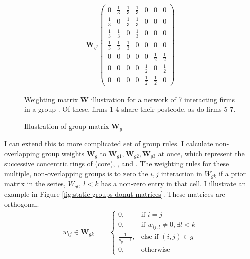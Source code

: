 \begin{figure}[hbtp]
    \caption{Illustration of group matrix $\mathbf W_g$}
    \label{fig:static-groups-W}
    \centering
    \par\noindent
    \begin{align*}
        \mathbf{W}_{g^*}
        \begin{pmatrix}
            0           & \frac{1}{3} & \frac{1}{3} & \frac{1}{3} & 0           & 0           & 0           \\
            \frac{1}{3} & 0           & \frac{1}{3} & \frac{1}{3} & 0           & 0           & 0           \\
            \frac{1}{3} & \frac{1}{3} & 0           & \frac{1}{3} & 0           & 0           & 0           \\
            \frac{1}{3} & \frac{1}{3} & \frac{1}{3} & 0           & 0           & 0           & 0           \\
            0           & 0           & 0           & 0           & 0           & \frac{1}{2} & \frac{1}{2} \\
            0           & 0           & 0           & 0           & \frac{1}{2} & 0           & \frac{1}{2} \\
            0           & 0           & 0           & 0           & \frac{1}{2} & \frac{1}{2} & 0           
        \end{pmatrix}
    \end{align*}
    \begin{tablenotes}
        Weighting matrix $\mathbf W$ illustration for a network of 7 interacting firms in a group .
        Of these, firms 1-4 share their postcode, as do firms 5-7.
    \end{tablenotes}
\end{figure}

I can extend this to more complicated set of group rules.
I calculate non-overlapping group weights $\mathbf W_g$ to $\mathbf W_{g1}, \mathbf W_{g2}, \mathbf W_{g3}$ at once,
which represent the successive concentric rings of  (core), , and .
The weighting rules for these multiple, non-overlapping groups is to zero the $i,j$ interaction in
$W_{gk}$ if a prior matrix in the series, $W_{gl},\ l<k$ has a non-zero entry in that cell.
I illustrate an example in Figure \ref{fig:static-groups-donut-matrices}.
These matrices are orthogonal.
\begin{align*}
        w_{ij}\in \mathbf{W}_{gk} &=
        \begin{cases}
            0,             & \text{if } i=j \\
            0,             & \text{if } w_{ij,l} \neq 0, \exists l<k \\
            \frac{1}{s_g-1}, & \text{else if } (i,j)\in g \\
            0,             & \text{otherwise}
        \end{cases}
\end{align*}

